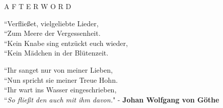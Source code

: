 \documentclass[12pt]{article}
\begin{document}
\begingroup
\begin{center}
\end{center}
\endgroup

\vspace{15\baselineskip}

\begingroup
\begin{center}
\huge A F T E R W O R D
\end{center}
\endgroup

\vspace{3\baselineskip}

\begingroup
``Verfließet, vielgeliebte Lieder,\\
``Zum Meere der Vergessenheit.\\
``Kein Knabe sing entzückt euch wieder,\\
``Kein Mädchen in der Blütenzeit.\\
\endgroup

\begingroup
``Ihr sanget nur von meiner Lieben,\\
``Nun spricht sie meiner Treue Hohn.\\
``Ihr wart ins Wasser eingeschrieben,\\
``\textit{So fließt den auch mit ihm davon.}"
\phantom{text} \hfill - \textbf{Johan Wolfgang von Göthe}\\
\endgroup
\end{document}
